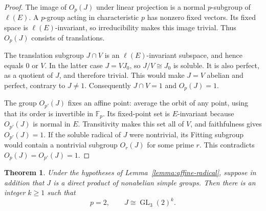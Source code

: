 \documentclass[11pt,a4paper]{amsart}
\newtheorem{theorem}{Theorem}[section]
\theoremstyle{remark}
\numberwithin{equation}{section}
\begin{document}
\begin{proof}
The image of $O_p(J)$ under linear projection is a normal $p$-subgroup of
$\ell(E)$. A $p$-group acting in characteristic $p$ has nonzero fixed
vectors. Its fixed space is $\ell(E)$-invariant, so irreducibility makes
this image trivial. Thus $O_p(J)$ consists of translations.

The translation subgroup $J\cap V$ is an $\ell(E)$-invariant subspace,
and hence equals $0$ or $V$. In the latter case $J=VJ_0$, so
$J/V\cong J_0$ is soluble. It is also perfect, as a quotient of $J$,
and therefore trivial. This would make $J=V$ abelian and perfect,
contrary to $J\ne1$. Consequently $J\cap V=1$ and $O_p(J)=1$.

The group $O_{p'}(J)$ fixes an affine point: average the orbit of any
point, using that its order is invertible in $\mathbb F_p$. Its fixed-point
set is $E$-invariant because $O_{p'}(J)$ is normal in $E$. Transitivity
makes this set all of $V$, and faithfulness gives $O_{p'}(J)=1$.
If the soluble radical of $J$ were nontrivial, its Fitting subgroup would
contain a nontrivial subgroup $O_r(J)$ for some prime $r$. This contradicts
$O_p(J)=O_{p'}(J)=1$.
\end{proof}

\begin{theorem}\label{thm:affine}
Under the hypotheses of Lemma~\ref{lemma:affine-radical}, suppose in addition
that $J$ is a direct product of nonabelian simple groups. Then there is an
integer $k\geq1$ such that
\[
 p=2,\qquad J\cong\operatorname{GL}_3(2)^k.
\]
\end{theorem}
\end{document}
